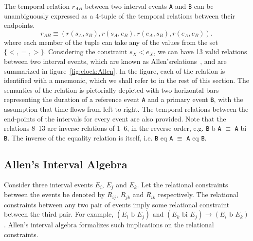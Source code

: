 The temporal relation $r_{AB}$ between two interval events \texttt{A} and \texttt{B} can be unambiguously expressed as a 4-tuple of  
the temporal relations between their endpoints. 
\begin{equation}
	r_{AB} \equiv ( r(s_A, s_B), r(s_A, e_B), r(e_A, s_B), r(e_A, e_B) ). 
\end{equation}
where each member of the tuple can take any of the values from the set $\{<,=,>\}$. 
Considering the constraint $s_X < e_X$, we can have 13 valid relations between two interval events, which are known as Allen'srelations~\citep{Allen:1983}, and are summarized in figure~\ref{fig:clock:Allen}. 
%
In the figure, each of the relation is identified with a mnemonic, which we shall refer to in the rest of this section. The semantics 
of the relation is pictorially depicted with two horizontal bars representing the duration of a reference event \texttt{A} and 
a primary event \texttt{B}, with the assumption that time flows from left to right. The temporal relations between the end-points 
of the intervals for every event are also provided. 
Note that the relations 8--13 are inverse relations of 1--6, in the reverse order, e.g. 
\texttt{B} b \texttt{A} $\equiv$ \texttt{A} bi \texttt{B}. The inverse of the equality relation is itself, i.e. 
\texttt{B} eq \texttt{A} $\equiv$ \texttt{A} eq \texttt{B}.

\subsection{Allen's Interval Algebra}
\label{sec:clock:Allen-algebra}

Consider three interval events $E_i$, $E_j$ and $E_k$. Let the relational constraints between the events be denoted
by $R_{ij}$, $R_{jk}$ and $R_{ik}$ respectively.  The relational constraints between any two pair of events imply some relational 
constraint between the third pair. For example, 
$(E_i \text{ b } E_j) \text{ and } (E_k \text{ bi } E_j) \rightarrow (E_i \text{ b } E_k)$.
Allen's interval algebra formalizes such implications on the relational constraints.
 
